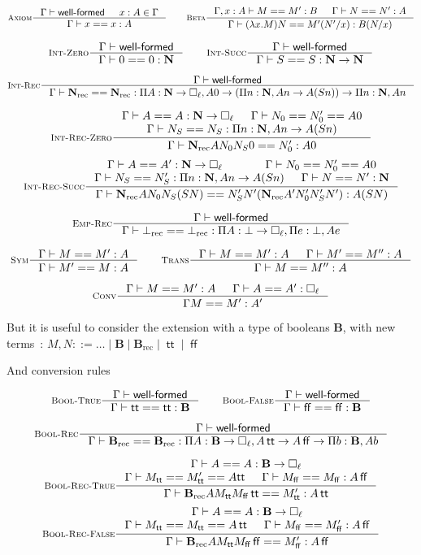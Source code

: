 \documentclass[11pt]{article}
\DeclareMathOperator{\rec}{rec}
\DeclareMathOperator{\true}{\mathsf{tt}}
\DeclareMathOperator{\false}{\mathsf{ff}}
\newcommand{\0}{\mathbf{0}}
\newcommand{\1}{\mathbf{1}}
\newcommand{\nat}{\mathbf{N}}
\newcommand{\bool}{\mathbf{B}}
\newcommand{\tctx}{\Gamma}
\newcommand{\Wf}{\textsf{well-formed}}
\begin{document}
$$
    \inference[\textsc{Axiom}]{\tctx |- \Wf & x : A \in \tctx }{\tctx |- x == x : A} \qquad
    \inference[\textsc{Beta}]{\tctx, x : A |- M == M' : B & \tctx |- N == N' : A}{\tctx |- (\lambda x. M)N == M'(N'/x) : B(N/x)}
$$

$$
    \inference[\textsc{Int-Zero}]{\tctx |- \Wf}{\tctx |- 0 == 0 : \nat} \qquad
    \inference[\textsc{Int-Succ}]{\tctx |- \Wf}{\tctx |- S == S : \nat -> \nat}
$$

$$
    \inference[\textsc{Int-Rec}]{\tctx |- \Wf}{\tctx |- \nat_{\rec} == \nat_{\rec} : \Pi A : \nat \to \square_\ell, A 0 \to \left(\Pi n:\nat, A n \to A (S n)\right) \to \Pi n :\nat, A n}
$$


$$
    \inference[\textsc{Int-Rec-Zero}]{\tctx |- A == A : \nat -> \square_\ell & \tctx |- N_0 == N'_0 == A 0\\ \tctx |- N_S == N_S : \Pi n:\nat, A n -> A(S n)}{\tctx |- \nat_{\rec} A N_0N_S0 == N'_0 : A 0}
$$
$$
    \inference[\textsc{Int-Rec-Succ}]{\tctx |- A == A' : \nat -> \square_\ell & \tctx |- N_0 == N'_0 == A 0\\ \tctx |- N_S == N'_S : \Pi n:\nat, A n -> A(S n) & \tctx |- N == N' :\nat}{\tctx |- \nat_{\rec} A N_0N_S (S N) == N'_S N' (\nat_{\rec}A' N'_0 N'_S N') : A (S N)}
$$


$$
    \inference[\textsc{Emp-Rec}]{\tctx |- \Wf}{\tctx |- \bot_{\rec} == \bot_{\rec} : \Pi A : \bot \to \square_\ell,\Pi e :\bot, A e}
$$

$$
    \inference[\textsc{Sym}]{\tctx |- M == M' : A}{\tctx |- M' == M : A} \qquad
    \inference[\textsc{Trans}]
    {\tctx |- M == M' :A & \tctx |- M' == M'' : A}{\tctx |- M == M'' : A}
$$

$$
    \inference[\textsc{Conv}]
    {\tctx |- M == M' :A & \tctx |- A == A' : \square_\ell}{\tctx M ==M' : A'}
$$

But it is useful to consider the extension with a type of booleans $\bool$, with new terms~:
 $ M,N ::= \dots \mid \bool\mid \bool_{\rec}\mid \true\mid \false$

 And conversion rules

$$
    \inference[\textsc{Bool-True}]{\tctx |- \Wf}{\tctx |- \true == \true : \bool} \qquad
    \inference[\textsc{Bool-False}]{\tctx |- \Wf}{\tctx |- \false == \false : \bool}
$$

$$
    \inference[\textsc{Bool-Rec}]{\tctx |- \Wf}{\tctx |- \bool_{\rec} == \bool_{\rec} : \Pi A : \bool \to \square_\ell, A \true \to A\false \to \Pi b :\bool, A b}
$$


$$
    \inference[\textsc{Bool-Rec-True}]{\tctx |- A == A : \bool -> \square_\ell \\ \tctx |- M_{\true} == M'_{\true} == A {\true} & \tctx |- M_{\false} == M_{\false} : A \false}{\tctx |- \bool_{\rec} A M_{\true} M_{\false} \true == M'_{\true} : A \true}
$$
$$
    \inference[\textsc{Bool-Rec-False}]{\tctx |- A == A : \bool -> \square_\ell \\ \tctx |- M_{\true} == M_{\true} == A \true & \tctx |- M_{\false} == M'_{\false} : A \false}{\tctx |- \bool_{\rec} A M_{\true} M_{\false} \false == M'_{\false} : A \false}
$$
\end{document}
